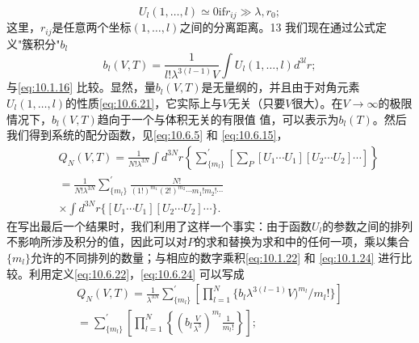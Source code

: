 \begin{equation}\tag{10.6.21}\label{eq:10.6.21}
U _ { l } ( 1 , \ldots , l ) \simeq 0  \mathrm { i f }  r _ { i j } \gg \lambda , r _ { 0 } ;
\end{equation}
这里，\(r_{ij}\)是任意两个坐标\((1,\ldots,l)\)之间的分离距离。13
我们现在通过公式定义"簇积分"\(b_{l}\)
\begin{equation}\tag{10.6.22}\label{eq:10.6.22}
b _ { l } ( V , T ) = \frac { 1 } { l ! \lambda ^{3 ( l - 1 )} V } \int U _ { l } ( 1 , \ldots , l ) d ^{3 l} r ;
\end{equation}
与\autoref{eq:10.1.16} 比较。显然，量\(b_{l}(V,T)\)是无量纲的，并且由于对角元素\(U_{l}(1,\ldots,l)\)的性质\autoref{eq:10.6.21}，它实际上与\(V\)无关（只要\(V\)很大）。在\(V\to\infty\)的极限情况下，\(b_{l}(V,T)\)趋向于一个与体积无关的有限值
值，可以表示为\(b_{l}(T)\)。然后我们得到系统的配分函数，见\autoref{eq:10.6.5} 和 \autoref{eq:10.6.15}，
\begin{equation}\tag{10.6.23}\label{eq:10.6.23}
\begin{array}{rlr} & { } & { Q _ { N } ( V , T ) = \frac { 1 } { N ! \lambda ^{3 N} } \int d ^{3 N} r \left\{ \sum _ { \{ m _ { l } \} } ^{\prime} \left[ \sum _ { P } [ U _ { 1 } \cdots U _ { 1 } ] [ U _ { 2 } \cdots U _ { 2 } ] \cdots \right] \right\} } \\& { } & { = \frac { 1 } { N ! \lambda ^{3 N} } \sum _ { \{ m _ { l } \} } ^{\prime} \frac { N ! } { ( 1 ! ) ^{m _ { 1} } ( 2 ! ) ^{m _ { 2} } \cdots m _ { 1 } ! m _ { 2 } ! \cdots } } \\& { } & { \times \int d ^{3 N} r \{ [ U _ { 1 } \cdots U _ { 1 } ] [ U _ { 2 } \cdots U _ { 2 } ] \cdots \} . } \end{array}
\end{equation}
在写出最后一个结果时，我们利用了这样一个事实：由于函数\(U_l\)的参数之间的排列不影响所涉及积分的值，因此可以对\(P\)的求和替换为求和中的任何一项，乘以集合\(\{m_l\}\)允许的不同排列的数量；与相应的数字乘积\autoref{eq:10.1.22} 和 \autoref{eq:10.1.24} 进行比较。利用定义\autoref{eq:10.6.22}，\autoref{eq:10.6.24} 可以写成
\begin{equation}\tag{10.6.24}\label{eq:10.6.24}
\begin{array}{r} { Q _ { N } ( V , T ) = \frac { 1 } { \lambda ^{3 N} } \sum _ { \{ m _ { l } \} } ^{\prime} \left[ \prod _ { l = 1 } ^{N} \{ b _ { l } \lambda ^{3 ( l - 1 )} V ) ^{m _ { l} } / m _ { l } ! \} \right] } \\{ = \sum _ { \{ m _ { l } \} } ^{\prime} \left[ \prod _ { l = 1 } ^{N} \left\{ \left( b _ { l } \frac { V } { \lambda ^{3} } \right) ^{m _ { l} } \frac { 1 } { m _ { l } ! } \right\} \right] ; } \end{array}
\end{equation}
